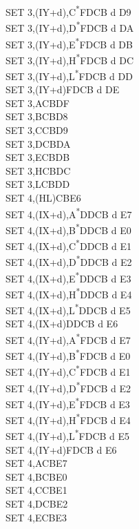 \documentclass[twoside,openright,a4paper]{book}
\begin{document}
\begin{multicols}{3}
{\begin{tabbing}
	SET 3,(IY+d),C\textsuperscript{*}\>FDCB d D9\\
	SET 3,(IY+d),D\textsuperscript{*}\>FDCB d DA\\
	SET 3,(IY+d),E\textsuperscript{*}\>FDCB d DB\\
	SET 3,(IY+d),H\textsuperscript{*}\>FDCB d DC\\
	SET 3,(IY+d),L\textsuperscript{*}\>FDCB d DD\\
	SET 3,(IY+d)\>FDCB d DE\\
	SET 3,A\>CBDF\\
	SET 3,B\>CBD8\\
	SET 3,C\>CBD9\\
	SET 3,D\>CBDA\\
	SET 3,E\>CBDB\\
	SET 3,H\>CBDC\\
	SET 3,L\>CBDD\\
	SET 4,(HL)\>CBE6\\
	SET 4,(IX+d),A\textsuperscript{*}\>DDCB d E7\\
	SET 4,(IX+d),B\textsuperscript{*}\>DDCB d E0\\
	SET 4,(IX+d),C\textsuperscript{*}\>DDCB d E1\\
	SET 4,(IX+d),D\textsuperscript{*}\>DDCB d E2\\
	SET 4,(IX+d),E\textsuperscript{*}\>DDCB d E3\\
	SET 4,(IX+d),H\textsuperscript{*}\>DDCB d E4\\
	SET 4,(IX+d),L\textsuperscript{*}\>DDCB d E5\\
	SET 4,(IX+d)\>DDCB d E6\\
	SET 4,(IY+d),A\textsuperscript{*}\>FDCB d E7\\
	SET 4,(IY+d),B\textsuperscript{*}\>FDCB d E0\\
	SET 4,(IY+d),C\textsuperscript{*}\>FDCB d E1\\
	SET 4,(IY+d),D\textsuperscript{*}\>FDCB d E2\\
	SET 4,(IY+d),E\textsuperscript{*}\>FDCB d E3\\
	SET 4,(IY+d),H\textsuperscript{*}\>FDCB d E4\\
	SET 4,(IY+d),L\textsuperscript{*}\>FDCB d E5\\
	SET 4,(IY+d)\>FDCB d E6\\
	SET 4,A\>CBE7\\
	SET 4,B\>CBE0\\
	SET 4,C\>CBE1\\
	SET 4,D\>CBE2\\
	SET 4,E\>CBE3\\

\end{tabbing}}
\end{multicols}
\end{document}
